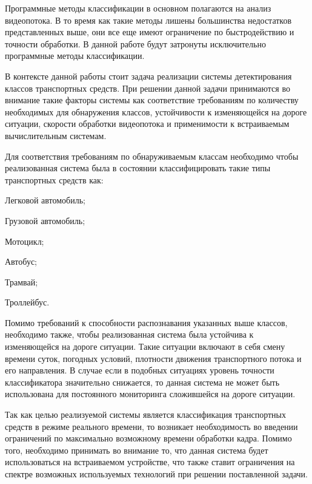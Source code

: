 Программные методы классификации в основном полагаются на анализ видеопотока. В то время как такие методы лишены большинства недостатков представленных выше, они все еще имеют ограничение по быстродействию и точности обработки. В данной работе будут затронуты исключительно программные методы классификации.

В контексте данной работы стоит задача реализации системы детектирования классов транспортных средств. При решении данной задачи принимаются во внимание такие факторы системы как соответствие требованиям по количеству необходимых для обнаружения классов, устойчивости к изменяющейся на дороге ситуации, скорости обработки видеопотока и применимости к встраиваемым вычислительным системам.
	
Для соответствия требованиям по обнаруживаемым классам необходимо чтобы реализованная система была в состоянии классифицировать такие типы транспортных средств как:
%
\begin{itemize*}
  \item Легковой автомобиль;
  \item Грузовой автомобиль;
  \item Мотоцикл;
  \item Автобус;
  \item Трамвай;
  \item Троллейбус.  
\end{itemize*}
%

Помимо требований к способности распознавания указанных выше классов, необходимо также, чтобы реализованная система была устойчива к изменяющейся на дороге ситуации. Такие ситуации включают в себя смену времени суток, погодных условий, плотности движения транспортного потока и его направления. В случае если в подобных ситуациях уровень точности классификатора значительно снижается, то данная система не может быть использована для постоянного мониторинга сложившейся на дороге ситуации. 

Так как целью реализуемой системы является классификация транспортных средств в режиме реального времени, то возникает необходимость во введении ограничений по максимально возможному времени обработки кадра. Помимо того, необходимо принимать во внимание то, что данная система будет использоваться на встраиваемом устройстве, что также ставит ограничения на спектре возможных используемых технологий при решении поставленной задачи.
